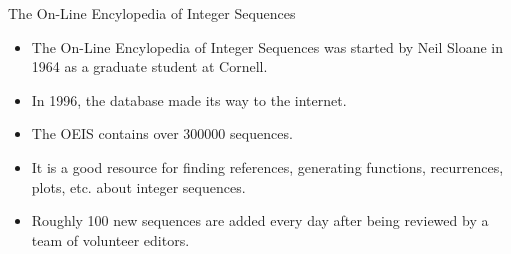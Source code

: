 \documentclass{beamer}
\begin{document}
\begin{frame}{The On-Line Encylopedia of Integer Sequences}
  \begin{itemize}
    \item The On-Line Encylopedia of Integer Sequences was started by
      Neil Sloane in 1964 as a graduate student at Cornell.
    \item In 1996, the database made its way to the internet.
    \item The OEIS contains over 300000 sequences.
    \item It is a good resource for finding references, generating functions,
      recurrences, plots, etc. about integer sequences.
    \item Roughly 100 new sequences are added every day after being reviewed by
      a team of volunteer editors.
  \end{itemize}
\end{frame}
\end{document}
